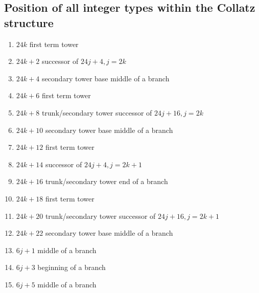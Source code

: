 \documentclass[sn-mathphys-num, pdflatex]{sn-jnl}
\begin{document}
\subsection{Position of all integer types within the Collatz structure}\label{sec2.1}
\begin{enumerate}
    \item $24k$ first term tower
    \item $24k+2$ successor of $24j+4, j=2k$
    \item $24k+4$ secondary tower base middle of a branch
    \item $24k+6$ first term tower
    \item $24k+8$ trunk/secondary tower successor of $24j+16, j = 2k$
    \item $24k+10$ secondary tower base middle of a branch
    \item $24k+12$ first term tower
    \item $24k+14$ successor of $24j+4, j = 2k+1$
    \item $24k+16$ trunk/secondary tower end of a branch
    \item $24k+18$ first term tower
    \item $24k+20$ trunk/secondary tower successor of $24j+16, j = 2k+1$
    \item $24k+22$ secondary tower base middle of a branch
    \item $6j + 1$ middle of a branch
    \item $6j + 3$ beginning of a branch
    \item $6j + 5$ middle of a branch
\end{enumerate}
\end{document}
